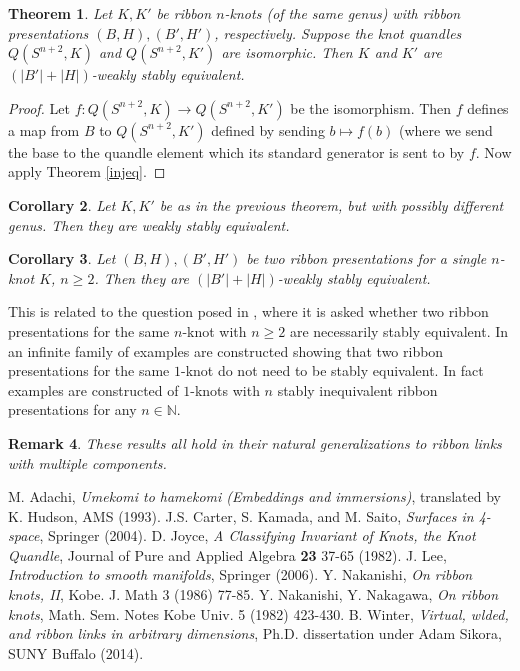 \documentclass{amsart}
\newtheorem{theorem}{Theorem}
\newtheorem{corollary}[theorem]{Corollary}
\newtheorem{remark}[theorem]{Remark}
\newcommand{\bpr}{\begin{proof}}
\newcommand{\epr}{\end{proof}}
\begin{document}
\begin{theorem}
Let $K, K'$ be ribbon $n$-knots (of the same genus) with ribbon presentations $(B, H), (B', H')$, respectively. Suppose the knot quandles $Q(S^{n+2}, K)$ and $Q(S^{n+2}, K')$ are isomorphic. Then $K$ and $K'$ are $(|B'|+|H|)$-weakly stably equivalent.
\end{theorem}
\bpr Let $f:Q(S^{n+2}, K)\rightarrow Q(S^{n+2}, K')$ be the isomorphism. Then $f$ defines a map from $B$ to $Q(S^{n+2}, K')$ defined by sending $b\mapsto f(b)$ (where we send the base to the quandle element which its standard generator is sent to by $f$. Now apply Theorem \ref{injeq}. \epr

\begin{corollary}
Let $K, K'$ be as in the previous theorem, but with possibly different genus. Then they are weakly stably equivalent.
\end{corollary}

\begin{corollary}
Let $(B, H), (B', H')$ be two ribbon presentations for a single $n$-knot $K$, $n\geq 2$. Then they are $(|B'|+|H|)$-weakly stably equivalent.
\end{corollary}

This is related to the question posed in \cite{Naka}, where it is asked whether two ribbon presentations for the same $n$-knot with $n\geq 2$ are necessarily stably equivalent. In \cite{NakaNaka} an infinite family of examples are constructed showing that two ribbon presentations for the same $1$-knot do not need to be stably equivalent. In fact examples are constructed of $1$-knots with $n$ stably inequivalent ribbon presentations for any $n\in\mathbb{N}$.

\begin{remark}
These results all hold in their natural generalizations to ribbon links with multiple components.
\end{remark}

%

\begin{thebibliography}{99}
 M. Adachi, \emph{Umekomi to hamekomi (Embeddings and immersions)}, translated by K. Hudson, AMS (1993). 
 J.S. Carter, S. Kamada, and M. Saito, \emph{Surfaces in 4-space},
Springer (2004).
 D. Joyce, \emph{A Classifying Invariant of Knots, the Knot Quandle},
Journal of Pure and Applied Algebra \textbf{23} 37-65 (1982).
 J. Lee, \emph{Introduction to smooth manifolds}, Springer (2006).
 Y. Nakanishi, \emph{On ribbon knots, II}, Kobe. J. Math 3 (1986) 77-85.
 Y. Nakanishi, Y. Nakagawa, \emph{On ribbon knots}, Math. Sem. Notes Kobe Univ. 5 (1982) 423-430.
 B. Winter, \emph{Virtual, wlded, and ribbon links in arbitrary dimensions}, Ph.D. dissertation under Adam Sikora, SUNY Buffalo (2014).
\end{thebibliography}
\end{document}
